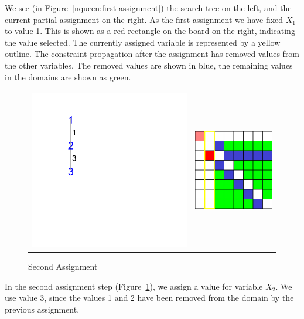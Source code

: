 We see (in Figure~\ref{nqueen:first assignment}) the search tree on the left, and the current partial assignment on the right. As the first assignment we have fixed $X_1$ to value 1. This is shown as a red rectangle on the board on the right, indicating the value selected. The currently assigned variable is represented by a yellow outline. The constraint propagation after the assignment has removed values from the other variables. The removed values are shown in blue, the remaining values in the domains are shown as green.

\begin{figure}[h]
\caption{\label{nqueen:second assignment} Second Assignment}
\begin{center}
\begin{tabular}{cc}
\includegraphics[width=8cm]{../nqueen/full/tree_expanded_3}
&
\includegraphics[width=4cm]{../nqueen/full/frame3}
\end{tabular}
\end{center}
\end{figure}

In the second assignment step (Figure~\ref{nqueen:second assignment}), we assign a value for variable $X_2$. We use value 3, since the values 1 and 2 have been removed from the domain by the previous assignment.

